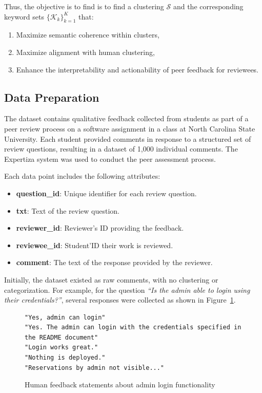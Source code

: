 \documentclass[manuscript,review, anonymous]{acmart}
\begin{document}
Thus, the objective is to find is to find a clustering $\mathcal{S}$ and the corresponding keyword sets $\{\mathcal{K}_k\}_{k=1}^K$ that:
\begin{enumerate}
    \item Maximize semantic coherence within clusters,
    \item Maximize alignment with human clustering,
    \item Enhance the interpretability and actionability of peer feedback for reviewees.
\end{enumerate}

\subsection{Data Preparation}

The dataset contains qualitative feedback collected from students as part of a peer review process on a software assignment in a class at North Carolina State University. Each student provided comments in response to a structured set of review questions, resulting in a dataset of 1,000 individual comments. The Expertiza system was used to conduct the peer assessment process. 

Each data point includes the following attributes:

\begin{itemize}
    \item \textbf{question\_id}: Unique identifier for each review question.
    \item \textbf{txt}: Text of the review question.
    \item \textbf{reviewer\_id}: Reviewer's ID providing the feedback.
    \item \textbf{reviewee\_id}: Student'ID their work is reviewed.
    \item \textbf{comment}: The text of the response provided by the reviewer.
\end{itemize}

Initially, the dataset existed as raw comments, with no clustering or categorization. For example, for the question \textit{``Is the admin able to login using their credentials?''}, several responses were collected as shown in Figure~\ref{fig:admin-feedback}. 

\begin{figure}[t]
\centering
\begin{minipage}{0.9\linewidth}
\begin{lstlisting}[style=feedbacklist]
"Yes, admin can login"
"Yes. The admin can login with the credentials specified in the README document"
"Login works great."
"Nothing is deployed."
"Reservations by admin not visible..."
\end{lstlisting}
\end{minipage}
\caption{Human feedback statements about admin login functionality}
\label{fig:admin-feedback}
\end{figure}
\end{document}
